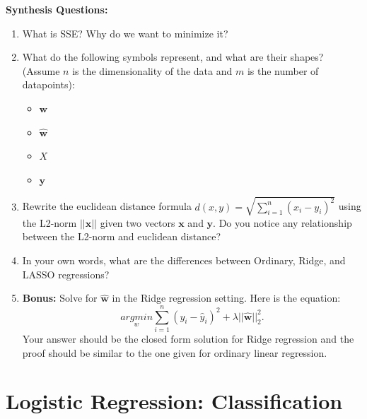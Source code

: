 \begin{questionbox}
\textbf{Synthesis Questions:}
\begin{enumerate}
    \item What is SSE? Why do we want to minimize it?
    \item What do the following symbols represent, and what are their shapes? (Assume $n$ is the dimensionality of the data and $m$ is the number of datapoints):
    \begin{itemize}
        \item $\textbf{w}$
        \item $\hat{\textbf{w}}$
        \item $X$
        \item $\textbf{y}$
    \end{itemize}
    \item Rewrite the euclidean distance formula $d(x,y) = \sqrt{\sum_{i=1}^n (x_i-y_i)^2}$ using the L2-norm $||\textbf{x}||$ given two vectors $\textbf{x}$ and $\textbf{y}$. Do you notice any relationship between the L2-norm and euclidean distance?
    \item In your own words, what are the differences between Ordinary, Ridge, and LASSO regressions?
    \item \textbf{Bonus:} Solve for $\hat{\textbf{w}}$ in the Ridge regression setting. Here is the equation:
      \[\underset{w}{argmin} \sum_{i=1}^n (y_i - \hat{y}_i)^2 + \lambda||\hat{\textbf{w}}||_2^2.\]
      Your answer should be the closed form solution for Ridge regression and the proof should be similar to the one given for ordinary linear regression.
\end{enumerate}
\end{questionbox}

\section{Logistic Regression: Classification}
